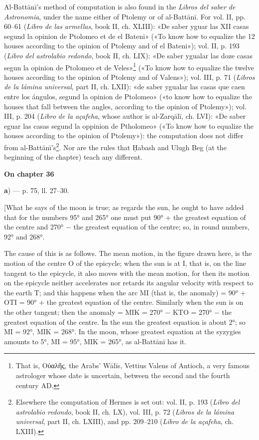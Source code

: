 \documentclass[11pt]{article}
\newcommand{\UnitHead}[2]{\par\setcounter{footnoteT}{0}\needspace{8\baselineskip}\bigskip\pdfbookmark[1]{#1}{unit-#2}\hypertarget{EN-#2}{}%
 {\large\bfseries\interlinepenalty=10000 #1\par}\nobreak\medskip}
\begin{document}
\par Al-Battānī's method of computation is also found in the \emph{Libros del saber de Astronomia}, under the name either of Ptolemy or of al-Battānī. For vol. II, pp. 60–61 (\emph{Libro de las armellas}, book II, ch. XLIII): «De saber yguar las XII casas segund la opinion de Ptolomeo et de el Bateni» («To know how to equalize the 12 houses according to the opinion of Ptolemy and of el Bateni»); vol. II, p. 193 (\emph{Libro del astrolabio redondo}, book II, ch. LIX): «De saber ygualar las doze casas segun la opinion de Ptolomeo et de Veles»\footnote{That is, {\greekfont Οὐαλῆς}, the Arabs' Wālīs, Vettius Valens of Antioch, a very famous astrologer whose date is uncertain, between the second and the fourth century AD.} («To know how to equalize the twelve houses according to the opinion of Ptolemy and of Valens»); vol. III, p. 71 (\emph{Libros de la lámina universal}, part II, ch. LXII): «de saber ygualar las casas que caen entre los ángulos, segund la opinion de Ptolomeo» («to know how to equalize the houses that fall between the angles, according to the opinion of Ptolemy»); vol. III, p. 204 (\emph{Libro de la açafeha}, whose author is al-Zarqālī, ch. LVI): «De saber eguar las casas segund la oppinion de Ptholomeo» («To know how to equalize the houses according to the opinion of Ptolemy»): the computation does not differ from al-Battānī's\footnote{Elsewhere the computation of Hermes is set out: vol. II, p. 193 (\emph{Libro del astrolabio redondo}, book II, ch. LX), vol. III, p. 72 (\emph{Libros de la lámina universal}, part II, ch. LXIII), and pp. 209–210 (\emph{Libro de la açafeha}, ch. LXIII).}. Nor are the rules that Ḥabash and Ulugh Beg (at the beginning of the chapter) teach any different.\par
\UnitHead{On chapter 36}{A36}
\par\begin{center}\textbf{a}) — p. 75, ll. 27–30.\end{center}
\par [What he says of the moon is true; as regards the sun, he ought to have added that for the numbers 95° and 265° one must put 90° + the greatest equation of the centre and 270° − the greatest equation of the centre; so, in round numbers, 92° and 268°.\par
\begin{center}\end{center}
\par The cause of this is as follows. The mean motion, in the figure drawn here, is the motion of the centre O of the epicycle; when the sun is at I, that is, on the line tangent to the epicycle, it also moves with the mean motion, for then its motion on the epicycle neither accelerates nor retards its angular velocity with respect to the earth T; and this happens when the arc MI (that is, the anomaly) = 90° + OTI = 90° + the greatest equation of the centre. Similarly when the sun is on the other tangent; then the anomaly = MIK = 270° − KTO = 270° − the greatest equation of the centre. In the sun the greatest equation is about 2°; so MI = 92°, MIK = 268°. In the moon, whose greatest equation at the syzygies amounts to 5°, MI = 95°, MIK = 265°, as al-Battānī has it.\par
\end{document}
